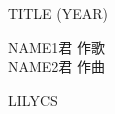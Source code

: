 ﻿\documentclass[10pt,b5j]{tarticle} %
\begin{document}
\thispagestyle{empty} %
\newcommand{\linespace}{1.0em} %
\newcommand{\blocksize}{0.5\hsize} %

\begin{minipage}[c]{0.7\hsize} %
	\begin{center}
		{\LARGE
			TITLE %
		}
		{\small 
			(YEAR) %
		}\\
	\end{center}
\end{minipage}
\begin{minipage}[c]{0.3\hsize} %
	\begin{flushright} %
		NAME1君 作歌\\ %
		NAME2君 作曲 %
	\end{flushright}
\end{minipage}

\vspace{1.5em} %
\begin{enumerate}
	\begin{minipage}[c]{\blocksize}
	
		LILYCS
	
	\end{minipage}
\end{enumerate}
\end{document}
